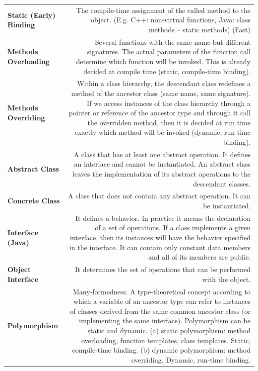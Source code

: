 \documentclass[margin=0px]{article}
\begin{document}
\begin{longtable}{L R}
\textbf{Static (Early) Binding} &
The compile-time assignment of the called method to the object. (E.g. C++: non-virtual functions, Java: class methods -- static methods) (Fast) \\[4pt]

\textbf{Methods Overloading} &
Several functions with the same name but different signatures. The actual parameters of the function call determine which function will be invoked. This is already decided at compile time (static, compile-time binding). \\[4pt]

\textbf{Methods Overriding} &
Within a class hierarchy, the descendant class redefines a method of the ancestor class (same name, same signature). If we access instances of the class hierarchy through a pointer or reference of the ancestor type and through it call the overridden method, then it is decided at run time exactly which method will be invoked (dynamic, run-time binding). \\[4pt]

\textbf{Abstract Class} &
A class that has at least one abstract operation. It defines an interface and cannot be instantiated. An abstract class leaves the implementation of its abstract operations to the descendant classes. \\[4pt]

\textbf{Concrete Class} &
A class that does not contain any abstract operation. It can be instantiated. \\[4pt]

\textbf{Interface (Java)} &
It defines a behavior. In practice it means the declaration of a set of operations. If a class implements a given interface, then its instances will have the behavior specified in the interface. It can contain only constant data members and all of its members are public. \\[4pt]

\textbf{Object Interface} &
It determines the set of operations that can be performed with the object. \\[4pt]

\textbf{Polymorphism} &
Many-formedness. A type-theoretical concept according to which a variable of an ancestor type can refer to instances of classes derived from the same common ancestor class (or implementing the same interface). Polymorphism can be static and dynamic.
(a) static polymorphism: method overloading, function templates, class templates. Static, compile-time binding.
(b) dynamic polymorphism: method overriding. Dynamic, run-time binding. \\[4pt]


\end{longtable}
\end{document}
